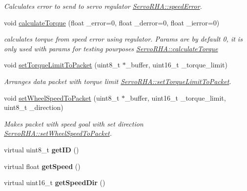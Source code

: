 \begin{DoxyCompactItemize}
\begin{DoxyCompactList}\small\item\em Calculates error to send to servo regulator  \hyperlink{classServoRHA_a51a002767a91a7e4c2a8edc9ce8ab0df}{Servo\+R\+H\+A\+::speed\+Error}. \end{DoxyCompactList}\item 
void \hyperlink{classServoRHA_afc5b8b9030190f3165840809faa74d9b}{calculate\+Torque} (float \+\_\+error=0, float \+\_\+derror=0, float \+\_\+ierror=0)
\begin{DoxyCompactList}\small\item\em calculates torque from speed error using regulator. Params are by default 0, it is only used with params for testing pourposes  \hyperlink{classServoRHA_afc5b8b9030190f3165840809faa74d9b}{Servo\+R\+H\+A\+::calculate\+Torque} \end{DoxyCompactList}\item 
void \hyperlink{classServoRHA_ad92cdbe72bb85e809c8cd60ad6701ac9}{set\+Torque\+Limit\+To\+Packet} (uint8\+\_\+t $\ast$\+\_\+buffer, uint16\+\_\+t \+\_\+torque\+\_\+limit)
\begin{DoxyCompactList}\small\item\em Arranges data packet with torque limit  \hyperlink{classServoRHA_ad92cdbe72bb85e809c8cd60ad6701ac9}{Servo\+R\+H\+A\+::set\+Torque\+Limit\+To\+Packet}. \end{DoxyCompactList}\item 
void \hyperlink{classServoRHA_ab2d5a2e9c4d2cbc0bd6e30530b938401}{set\+Wheel\+Speed\+To\+Packet} (uint8\+\_\+t $\ast$\+\_\+buffer, uint16\+\_\+t \+\_\+torque\+\_\+limit, uint8\+\_\+t \+\_\+direction)
\begin{DoxyCompactList}\small\item\em Makes packet with speed goal with set direction  \hyperlink{classServoRHA_ab2d5a2e9c4d2cbc0bd6e30530b938401}{Servo\+R\+H\+A\+::set\+Wheel\+Speed\+To\+Packet}. \end{DoxyCompactList}\item 
virtual uint8\+\_\+t {\bfseries get\+ID} ()\hypertarget{classServoRHA_a5454c2a13b6656a590b7802e88cd1fbb}{}\label{classServoRHA_a5454c2a13b6656a590b7802e88cd1fbb}

\item 
virtual float {\bfseries get\+Speed} ()\hypertarget{classServoRHA_ab104a08e1fe03fc6afd9c3e3af2ab3de}{}\label{classServoRHA_ab104a08e1fe03fc6afd9c3e3af2ab3de}

\item 
virtual uint16\+\_\+t {\bfseries get\+Speed\+Dir} ()\hypertarget{classServoRHA_aebcd18b6b147109d53362d2f61f1687b}{}\label{classServoRHA_aebcd18b6b147109d53362d2f61f1687b}


\end{DoxyCompactItemize}
